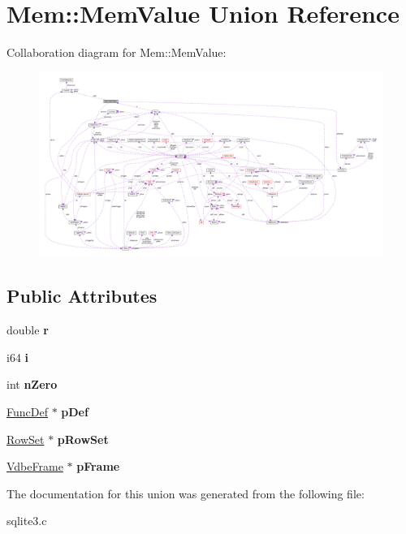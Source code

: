 \hypertarget{unionMem_1_1MemValue}{}\section{Mem\+:\+:Mem\+Value Union Reference}
\label{unionMem_1_1MemValue}


Collaboration diagram for Mem\+:\+:Mem\+Value\+:\nopagebreak
\begin{figure}[H]
\begin{center}
\leavevmode
\includegraphics[width=350pt]{unionMem_1_1MemValue__coll__graph}
\end{center}
\end{figure}
\subsection*{Public Attributes}
\begin{DoxyCompactItemize}
\item 
double {\bfseries r}\hypertarget{unionMem_1_1MemValue_a1b30b01a5b7a3b337eeec4f39fb2a60c}{}\label{unionMem_1_1MemValue_a1b30b01a5b7a3b337eeec4f39fb2a60c}

\item 
i64 {\bfseries i}\hypertarget{unionMem_1_1MemValue_ac783c60cc4b1c0893931c997aa04ded6}{}\label{unionMem_1_1MemValue_ac783c60cc4b1c0893931c997aa04ded6}

\item 
int {\bfseries n\+Zero}\hypertarget{unionMem_1_1MemValue_a23976c454e79a60ca692305825792ca8}{}\label{unionMem_1_1MemValue_a23976c454e79a60ca692305825792ca8}

\item 
\hyperlink{structFuncDef}{Func\+Def} $\ast$ {\bfseries p\+Def}\hypertarget{unionMem_1_1MemValue_ad91c4fa3bebcc8bd9efa862841fd928d}{}\label{unionMem_1_1MemValue_ad91c4fa3bebcc8bd9efa862841fd928d}

\item 
\hyperlink{structRowSet}{Row\+Set} $\ast$ {\bfseries p\+Row\+Set}\hypertarget{unionMem_1_1MemValue_ab8b5abb605d926c611818285ecb3f7c5}{}\label{unionMem_1_1MemValue_ab8b5abb605d926c611818285ecb3f7c5}

\item 
\hyperlink{structVdbeFrame}{Vdbe\+Frame} $\ast$ {\bfseries p\+Frame}\hypertarget{unionMem_1_1MemValue_aa86f6085bfafd8a9ab3f41ac553f49fa}{}\label{unionMem_1_1MemValue_aa86f6085bfafd8a9ab3f41ac553f49fa}

\end{DoxyCompactItemize}


The documentation for this union was generated from the following file\+:\begin{DoxyCompactItemize}
\item 
sqlite3.\+c\end{DoxyCompactItemize}
